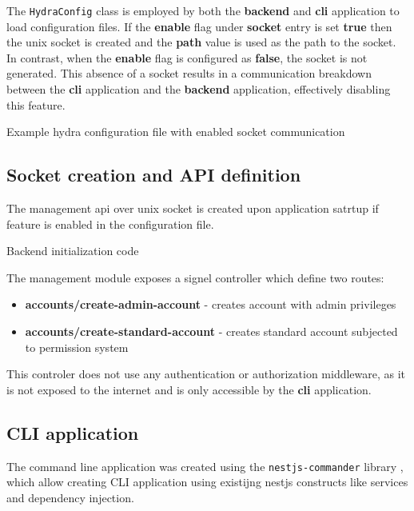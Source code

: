 \documentclass[../main.tex]{subfiles}
\begin{document}
The \texttt{HydraConfig} class is employed by both the \textbf{backend} and \textbf{cli} application to load configuration files.
If the \textbf{enable} flag under \textbf{socket} entry is set \textbf{true} then the unix socket is created and the \textbf{path} value is used as the path to the socket.
In contrast, when the \textbf{enable} flag is configured as \textbf{false}, the socket is not generated.
This absence of a socket results in a communication breakdown between the \textbf{cli} application and the \textbf{backend} application, effectively disabling this feature.

\begin{listing}[H]
  \caption{Example hydra configuration file with enabled socket communication}
\end{listing}

\subsection{Socket creation and API definition}

The management api over unix socket is created upon application satrtup if feature is enabled in the configuration file.

\begin{listing}[H]
  \caption{Backend initialization code}
\end{listing}

The management module exposes a signel controller which define two routes:

\begin{itemize}
  \item \textbf{accounts/create-admin-account} - creates account with admin privileges
  \item \textbf{accounts/create-standard-account} - creates standard account subjected to permission system
\end{itemize}

This controler does not use any authentication or authorization middleware, as it is not exposed to the internet and is only accessible by the \textbf{cli} application.

\subsection{CLI application}

The command line application was created using the \texttt{nestjs-commander} library \cite{nestjs-commander}, which allow creating CLI application using
existijng nestjs constructs like services and dependency injection.
\end{document}
